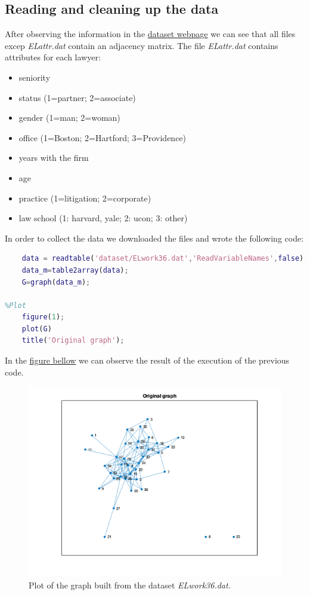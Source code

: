 \documentclass[12pt]{article}
\begin{document}
\subsection{Reading and cleaning up the data}
\justifying
After observing the information in the \href{https://www.stats.ox.ac.uk/~snijders/siena/Lazega_lawyers_data.htm}{dataset webpage} we can see that all files excep \textit{ELattr.dat} contain an adjacency matrix. The file \textit{ELattr.dat} contains attributes for each lawyer:
\smallskip
\begin{itemize}
    \item seniority
    \item status (1=partner; 2=associate)
    \item gender (1=man; 2=woman)
    \item office (1=Boston; 2=Hartford; 3=Providence)
    \item years with the firm
    \item age
    \item practice (1=litigation; 2=corporate)
    \item law school (1: harvard, yale; 2: ucon; 3: other)
\end{itemize}
\justifying
In order to collect the data we downloaded the files and wrote the following code:
\smallskip
\begin{lstlisting}[language=matlab]
%% Reading and cleaning up the data
    data = readtable('dataset/ELwork36.dat','ReadVariableNames',false);
    data_m=table2array(data);
    G=graph(data_m);

%Plot
    figure(1);
    plot(G)
    title('Original graph');
\end{lstlisting}
In the \href{fig:completeGraph}{figure bellow} we can observe the result of the execution of the previous code. 
\begin{figure}[H]
	\centering
	\includegraphics[width=13cm]{images/1.png}
	\caption{Plot of the graph built from the dataset \textit{ELwork36.dat.}}
	\label{fig:completeGraph}
\end{figure}
\end{document}
